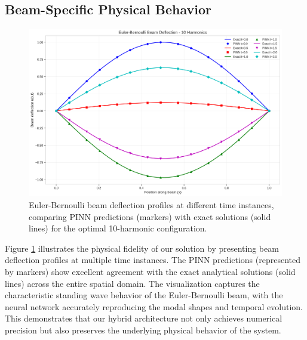 \subsection{Beam-Specific Physical Behavior}

\begin{figure}[ht]
    \centering
    \includegraphics[width = 1.0\linewidth]{figures/euler_bernoulli_beam_10h.png}
    \caption{Euler-Bernoulli beam deflection profiles at different time instances, comparing PINN predictions (markers) with exact solutions (solid lines) for the optimal 10-harmonic configuration.}
    \label{fig:beam_deflection}
\end{figure}

Figure \ref{fig:beam_deflection} illustrates the physical fidelity of our solution by presenting beam deflection profiles at multiple time instances. The PINN predictions (represented by markers) show excellent agreement with the exact analytical solutions (solid lines) across the entire spatial domain. The visualization captures the characteristic standing wave behavior of the Euler-Bernoulli beam, with the neural network accurately reproducing the modal shapes and temporal evolution. This demonstrates that our hybrid architecture not only achieves numerical precision but also preserves the underlying physical behavior of the system.

